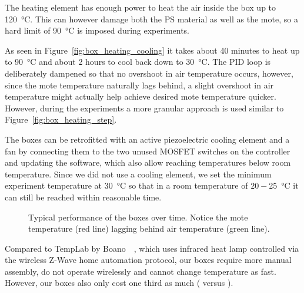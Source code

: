 The heating element has enough power to heat the air inside the box up to \SI{120}{\celsius}.
This can however damage both the \ac{PS} material as well as the mote, so a hard limit of \SI{90}{\celsius} is imposed during experiments.

As seen in Figure~\ref{fig:box_heating_cooling} it takes about 40 minutes to heat up to \SI{90}{\celsius} and about 2 hours to cool back down to \SI{30}{\celsius}.
The \acs{PID} loop is deliberately dampened so that no overshoot in air temperature occurs, however, since the mote temperature naturally lags behind, a slight overshoot in air temperature might actually help achieve desired mote temperature quicker.
However, during the experiments a more granular approach is used similar to Figure~\ref{fig:box_heating_step}.

The boxes can be retrofitted with an active piezoelectric cooling element and a fan by connecting them to the two unused \acs{MOSFET} switches on the controller and updating the software, which also allow reaching temperatures below room temperature.
Since we did not use a cooling element, we set the minimum experiment temperature at \SI{30}{\celsius} so that in a room temperature of $20-$\SI{25}{\celsius} it can still be reached within reasonable time.

\begin{figure}[t]
	\caption{Typical performance of the boxes over time. Notice the mote temperature (red line) lagging behind air temperature (green line).}
	\label{fig:box_heating_curves}
\end{figure}

Compared to TempLab by Boano~\etal~\cite{Boano2014}, which uses infrared heat lamp controlled via the wireless Z-Wave home automation protocol, our boxes require more manual assembly, do not operate wirelessly and cannot change temperature as fast.
However, our boxes also only cost one third as much ( versus ).

